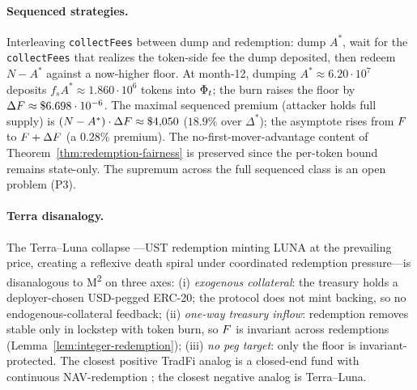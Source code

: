 \paragraph{Sequenced strategies.} Interleaving \texttt{collectFees} between dump and redemption: dump $A^*$, wait for the \texttt{collectFees} that realizes the token-side fee the dump deposited, then redeem $N - A^*$ against a now-higher floor. At month-12, dumping $A^* \approx 6.20 \cdot 10^7$ deposits $f_s A^* \approx 1.860 \cdot 10^6$ tokens into $\Phi_t$; the burn raises the floor by $\Delta F \approx \$6.698 \cdot 10^{-6}$. The maximal sequenced premium (attacker holds full supply) is $(N - A^*) \cdot \Delta F \approx \$4{,}050$ ($18.9\%$ over $\Delta^*$); the asymptote rises from $F$ to $F + \Delta F$ (a $0.28\%$ premium). The no-first-mover-advantage content of Theorem~\ref{thm:redemption-fairness} is preserved since the per-token bound remains state-only. The supremum across the full sequenced class is an open problem (P3).

\paragraph{Terra disanalogy.} The Terra--Luna collapse \citep{LiuMakarovSchoar2023,Briola2023}---UST redemption minting LUNA at the prevailing price, creating a reflexive death spiral under coordinated redemption pressure---is disanalogous to M\textsuperscript{2} on three axes: (i) \emph{exogenous collateral}: the treasury holds a deployer-chosen USD-pegged ERC-20; the protocol does not mint backing, so no endogenous-collateral feedback; (ii) \emph{one-way treasury inflow}: redemption removes stable only in lockstep with token burn, so $F$ is invariant across redemptions (Lemma~\ref{lem:integer-redemption}); (iii) \emph{no peg target}: only the floor is invariant-protected. The closest positive TradFi analog is a closed-end fund with continuous NAV-redemption \citep{LeeShleiferThaler1991,CherkesSagiStanton2009}; the closest negative analog is Terra--Luna.

